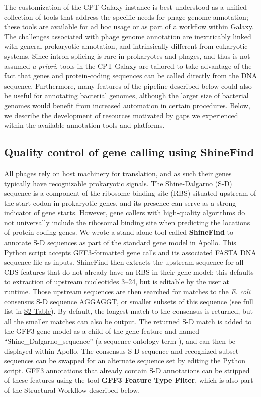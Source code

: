 The customization of the CPT Galaxy instance is best understood as a
unified collection of tools that address the specific needs for phage
genome annotation; these tools are available for ad hoc usage or as part
of a workflow within Galaxy. The challenges associated with phage genome
annotation are inextricably linked with general prokaryotic annotation,
and intrinsically different from eukaryotic systems. Since intron
splicing is rare in prokaryotes and phages, and thus is not assumed
\emph{a priori}, tools in the CPT Galaxy are tailored to take advantage
of the fact that genes and protein-coding sequences can be called
directly from the DNA sequence. Furthermore, many features of the
pipeline described below could also be useful for annotating bacterial
genomes, although the larger size of bacterial genomes would benefit
from increased automation in certain procedures. Below, we describe the
development of resources motivated by gaps we experienced within the
available annotation tools and platforms.

\subsection*{Quality control of gene calling using ShineFind}

All phages rely on host machinery for translation, and as such their
genes typically have recognizable prokaryotic signals. The
Shine-Dalgarno (S-D) sequence is a component of the ribosome binding
site (RBS) situated upstream of the start codon in prokaryotic genes,
and its presence can serve as a strong indicator of gene starts.
However, gene callers with high-quality algorithms do not universally
include the ribosomal binding site when predicting the locations of
protein-coding genes. We wrote a stand-alone tool called
\textbf{ShineFind} to annotate S-D sequences as part of the standard
gene model in Apollo. This Python script accepts GFF3-formatted gene
calls and its associated FASTA DNA sequence file as inputs. ShineFind
then extracts the upstream sequence for all CDS features that do not
already have an RBS in their gene model; this defaults to extraction of
upstream nucleotides 3--24, but is editable by the user at runtime.
Those upstream sequences are then searched for matches to the \emph{E}.
\emph{coli} consensus S-D sequence AGGAGGT, or smaller subsets of this
sequence (see full list in \protect\hyperlink{pcbi.1008214.s002}{S2
Table}). By default, the longest match to the consensus is returned, but
all the smaller matches can also be output. The returned S-D match is
added to the GFF3 gene model as a child of the gene feature and named
``Shine\_Dalgarno\_sequence'' (a sequence ontology term \cite{Mungall_2011,Eilbeck_2005}),
and can then be displayed within Apollo. The consensus S-D sequence and
recognized subset sequences can be swapped for an alternate sequence set
by editing the Python script. GFF3 annotations that already contain S-D
annotations can be stripped of these features using the tool
\textbf{GFF3 Feature Type Filter}, which is also part of the Structural
Workflow described below.


